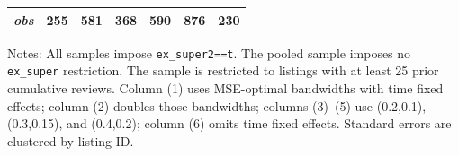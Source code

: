 \begin{table}[!htbp]
\begin{tabular}{lcccccc}
\textit{obs} & 255 & 581 & 368 & 590 & 876 & 230 \\
\bottomrule
\end{tabular}
\begin{minipage}{0.98\textwidth}\footnotesize
Notes: All samples impose \texttt{ex\_super2==t}. The pooled sample imposes no \texttt{ex\_super} restriction. The sample is restricted to listings with at least 25 prior cumulative reviews. Column (1) uses MSE-optimal bandwidths with time fixed effects; column (2) doubles those bandwidths; columns (3)--(5) use (0.2,0.1), (0.3,0.15), and (0.4,0.2); column (6) omits time fixed effects. Standard errors are clustered by listing ID.
\end{minipage}
\end{table}
